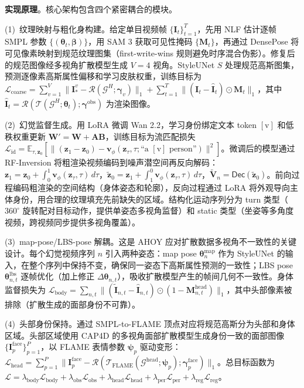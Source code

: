 \textbf{实现原理}。核心架构包含四个紧密耦合的模块。

(1)~纹理映射与粗化身构建。给定单目视频帧 $\{\mathbf{I}_t\}_{t=1}^{T}$，先用 NLF 估计逐帧 SMPL 参数 $\{(\bm{\theta}_t, \bm{\beta})\}$，用 SAM 3 获取可见性掩码 $\{\mathbf{M}_t\}$，再通过 DensePose 将可见像素映射到规范纹理图集（first-write-wins 规则避免时序混合伪影）。修复后的规范图像经多视角扩散模型生成 $V{=}4$ 视角。StyleUNet $S$ 处理规范高斯图集，预测逐像素高斯属性偏移和学习皮肤权重，训练目标为 $\mathcal{L}_{\text{coarse}} = \sum_{v=1}^{V} \|\mathbf{I}_*^{v} - \mathcal{R}(\mathcal{G}^{H}; \bm{\gamma}_{v})\|_1 + \sum_{t=1}^{T} \|(\mathbf{I}_t - \hat{\mathbf{I}}_t) \odot \mathbf{M}_t\|_1$，其中 $\hat{\mathbf{I}}_t = \mathcal{R}(\mathcal{T}(\mathcal{G}^{H}; \bm{\theta}_t); \bm{\gamma}^{\text{obs}})$ 为渲染图像。

(2)~幻觉监督生成。用 LoRA 微调 Wan 2.2，学习身份绑定文本 token $[\text{v}]$ 和低秩权重更新 $\mathbf{W}' = \mathbf{W} + \mathbf{A}\mathbf{B}$，训练目标为流匹配损失 $\mathcal{L}_{\text{id}} = \mathbb{E}_{\tau, \mathbf{z}_0}[\|(\mathbf{z}_1 - \mathbf{z}_0) - \mathbf{v}_\phi(\mathbf{z}_\tau, \tau; \text{``a }[\text{v}]\text{ person''})\|^2]$。微调后的模型通过 RF-Inversion 将粗渲染视频编码到噪声潜空间再反向解码：$\mathbf{z}_1 = \mathbf{z}_0 + \int_0^1 \mathbf{v}_\phi(\mathbf{z}_\tau, \tau)\,d\tau$，$\tilde{\mathbf{z}}_0 = \mathbf{z}_1 + \int_1^0 \mathbf{v}_\phi(\mathbf{z}_\tau, \tau)\,d\tau$，$\tilde{\mathbf{V}}_n = \mathsf{Dec}(\tilde{\mathbf{z}}_0)$。前向过程编码粗渲染的空间结构（身体姿态和轮廓），反向过程通过 LoRA 将外观导向主体身份，用合理的纹理填充先前缺失的区域。结构化运动序列分为 turn 类型（$360^{\circ}$ 旋转配对目标动作，提供单姿态多视角监督）和 static 类型（坐姿等多角度视频，跨视频同步提供多视角覆盖）。

(3)~map-pose/LBS-pose 解耦。这是 AHOY 应对扩散数据多视角不一致性的关键设计。每个幻觉视频序列 $n$ 引入两种姿态：map pose $\bm{\theta}_n^{\text{map}}$ 作为 StyleUNet 的输入，在整个序列中保持不变，确保同一姿态下高斯属性预测的一致性；LBS pose $\bm{\theta}_{n,t}^{\text{lbs}}$ 逐帧优化（加上修正 $\Delta\bm{\theta}_{n,t}$），吸收扩散模型产生的帧间几何不一致性。身体监督损失为 $\mathcal{L}_{\text{body}} = \sum_{n,t} \|(\tilde{\mathbf{I}}_{n,t} - \hat{\mathbf{I}}_{n,t}) \odot (1 - \mathbf{M}_{n,t}^{\text{head}})\|_1$，其中头部像素被排除（扩散生成的面部身份不可靠）。

(4)~头部身份保持。通过 SMPL-to-FLAME 顶点对应将规范高斯分为头部和身体区域。头部区域使用 CAP4D 的多视角面部扩散模型生成身份一致的面部图像 $\{\mathbf{I}_p^{\text{face}}\}_{p=1}^{P}$，以 FLAME 表情参数 $\bm{\psi}_p$ 驱动变形：$\mathcal{L}_{\text{head}} = \sum_{p=1}^{P} \|\mathbf{I}_p^{\text{face}} - \mathcal{R}(\mathcal{T}_{\text{FLAME}}(\mathcal{G}^{\text{head}}; \bm{\psi}_p); \bm{\gamma}_p^{\text{face}})\|_1$。总目标函数为 $\mathcal{L} = \lambda_{\text{body}}\mathcal{L}_{\text{body}} + \lambda_{\text{obs}}\mathcal{L}_{\text{obs}} + \lambda_{\text{head}}\mathcal{L}_{\text{head}} + \lambda_{\text{per}}\mathcal{L}_{\text{per}} + \lambda_{\text{reg}}\mathcal{L}_{\text{reg}}$。

